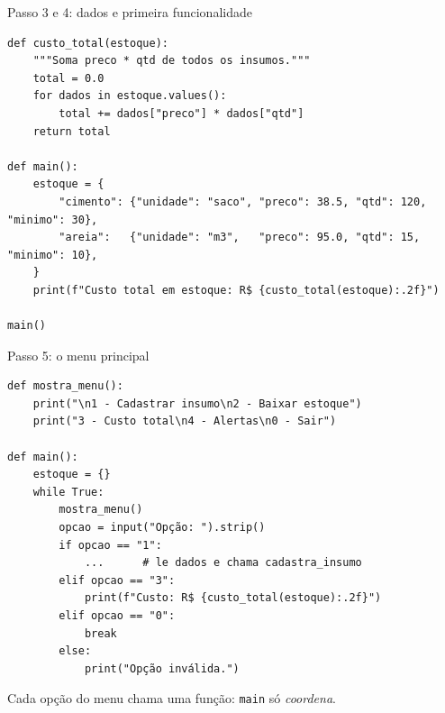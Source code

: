 \documentclass[aspectratio=169,10pt,t]{beamer}
\begin{document}
\begin{frame}[fragile]{Passo 3 e 4: dados e primeira funcionalidade}
\begin{lstlisting}
def custo_total(estoque):
    """Soma preco * qtd de todos os insumos."""
    total = 0.0
    for dados in estoque.values():
        total += dados["preco"] * dados["qtd"]
    return total

def main():
    estoque = {
        "cimento": {"unidade": "saco", "preco": 38.5, "qtd": 120, "minimo": 30},
        "areia":   {"unidade": "m3",   "preco": 95.0, "qtd": 15,  "minimo": 10},
    }
    print(f"Custo total em estoque: R$ {custo_total(estoque):.2f}")

main()
\end{lstlisting}
\end{frame}

\begin{frame}[fragile]{Passo 5: o menu principal}
\begin{lstlisting}[basicstyle=\ttfamily\scriptsize]
def mostra_menu():
    print("\n1 - Cadastrar insumo\n2 - Baixar estoque")
    print("3 - Custo total\n4 - Alertas\n0 - Sair")

def main():
    estoque = {}
    while True:
        mostra_menu()
        opcao = input("Opção: ").strip()
        if opcao == "1":
            ...      # le dados e chama cadastra_insumo
        elif opcao == "3":
            print(f"Custo: R$ {custo_total(estoque):.2f}")
        elif opcao == "0":
            break
        else:
            print("Opção inválida.")
\end{lstlisting}
  \small Cada opção do menu chama uma função: \texttt{main} só \emph{coordena}.
\end{frame}
\end{document}
